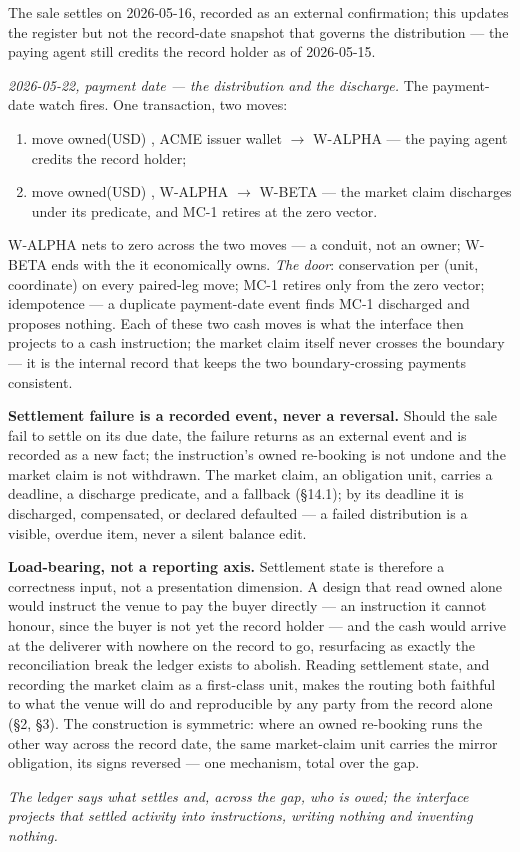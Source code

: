 The sale settles on 2026-05-16, recorded as an external confirmation; this updates
the register but not the record-date snapshot that governs the distribution --- the
paying agent still credits the record holder as of 2026-05-15.

\emph{2026-05-22, payment date --- the distribution and the discharge.} The
payment-date watch fires. One transaction, two moves:
\begin{enumerate}[label=(\arabic*),nosep]
\item move owned(USD) , ACME issuer wallet $\to$ W-ALPHA --- the paying
agent credits the record holder;
\item move owned(USD) , W-ALPHA $\to$ W-BETA --- the market claim
discharges under its predicate, and MC-1 retires at the zero vector.
\end{enumerate}
W-ALPHA nets to zero across the two moves --- a conduit, not an owner; W-BETA ends
with the  it economically owns. \emph{The door}: conservation per
(unit, coordinate) on every paired-leg move; MC-1 retires only from the zero vector;
idempotence --- a duplicate payment-date event finds MC-1 discharged and proposes
nothing. Each of these two cash moves is what the interface then projects to a cash
instruction; the market claim itself never crosses the boundary --- it is the
internal record that keeps the two boundary-crossing payments consistent.

\medskip\noindent\textbf{Settlement failure is a recorded event, never a reversal.}
Should the sale fail to settle on its due date, the failure returns as an external
event and is recorded as a new fact; the instruction's owned re-booking is not undone
and the market claim is not withdrawn. The market claim, an obligation unit, carries
a deadline, a discharge predicate, and a fallback (\S14.1); by its deadline it is
discharged, compensated, or declared defaulted --- a failed distribution is a
visible, overdue item, never a silent balance edit.

\medskip\noindent\textbf{Load-bearing, not a reporting axis.} Settlement state is
therefore a correctness input, not a presentation dimension. A design that read owned
alone would instruct the venue to pay the buyer directly --- an instruction it cannot
honour, since the buyer is not yet the record holder --- and the cash would arrive at
the deliverer with nowhere on the record to go, resurfacing as exactly the
reconciliation break the ledger exists to abolish. Reading settlement state, and
recording the market claim as a first-class unit, makes the routing both faithful to
what the venue will do and reproducible by any party from the record alone (\S2,
\S3). The construction is symmetric: where an owned re-booking runs the other way
across the record date, the same market-claim unit carries the mirror obligation, its
signs reversed --- one mechanism, total over the gap.

\emph{The ledger says what settles and, across the gap, who is owed; the interface
projects that settled activity into instructions, writing nothing and inventing
nothing.}
